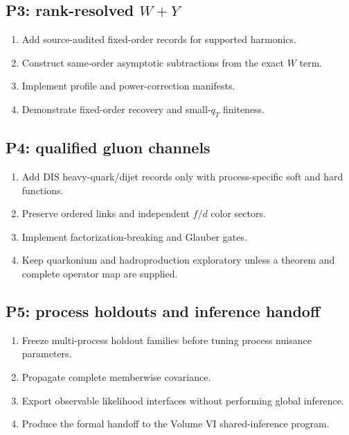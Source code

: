 \documentclass[11pt]{article}
\begin{document}
\subsection{P3: rank-resolved \texorpdfstring{\(W+Y\)}{W+Y}}

\begin{enumerate}
\item Add source-audited fixed-order records for supported harmonics.
\item Construct same-order asymptotic subtractions from the exact \(W\) term.
\item Implement profile and power-correction manifests.
\item Demonstrate fixed-order recovery and small-\(q_T\) finiteness.
\end{enumerate}

\subsection{P4: qualified gluon channels}

\begin{enumerate}
\item Add DIS heavy-quark/dijet records only with process-specific soft and hard functions.
\item Preserve ordered links and independent \(f/d\) color sectors.
\item Implement factorization-breaking and Glauber gates.
\item Keep quarkonium and hadroproduction exploratory unless a theorem and complete operator map are supplied.
\end{enumerate}

\subsection{P5: process holdouts and inference handoff}

\begin{enumerate}
\item Freeze multi-process holdout families before tuning process nuisance parameters.
\item Propagate complete memberwise covariance.
\item Export observable likelihood interfaces without performing global inference.
\item Produce the formal handoff to the Volume VI shared-inference program.
\end{enumerate}
\end{document}

